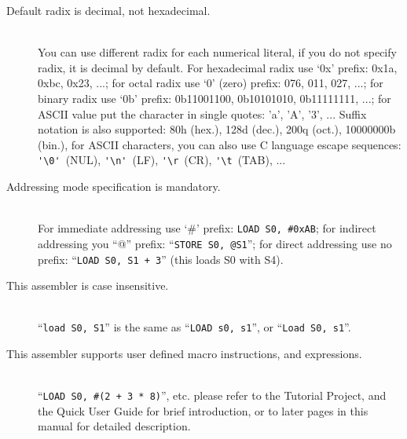     \begin{description}
        \item[Default radix is decimal, not hexadecimal.]~\\
            You can use different radix for each numerical literal, if you do not specify radix, it is decimal by default. For hexadecimal radix use `0x' prefix: 0x1a, 0xbc, 0x23, ...; for octal radix use `0' (zero) prefix: 076, 011, 027, ...; for binary radix use `0b' prefix: 0b11001100, 0b10101010, 0b11111111, ...; for ASCII value put the character in single quotes: 'a', 'A', '3', ... Suffix notation is also supported: 80h (hex.), 128d (dec.), 200q (oct.), 10000000b (bin.), for ASCII characters, you can also use C language escape sequences: \verb"'\0'"~(NUL), \verb"'\n'"~(LF), \verb"'\r"~(CR), \verb"'\t"~(TAB), ...
        \item[Addressing mode specification is mandatory.]~\\
            For immediate addressing use `\#' prefix: \texttt{LOAD~S0,~\#0xAB}; for indirect addressing you ``@'' prefix: ``\texttt{STORE~S0,~@S1}''; for direct addressing use no prefix: ``\texttt{LOAD~S0,~S1~+~3}'' (this loads S0 with S4).
        \item[This assembler is case insensitive.]~\\
            ``\texttt{load~S0,~S1}'' is the same as ``\texttt{LOAD~s0,~s1}'', or ``\texttt{Load~S0,~s1}''.
        \item[This assembler supports user defined macro instructions, and expressions.]~\\
            ``\texttt{LOAD~S0,~\#(2~+~3~*~8)}'', etc. please refer to the Tutorial Project, and the Quick User Guide for brief introduction, or to later pages in this manual for detailed description.
    \end{description}
